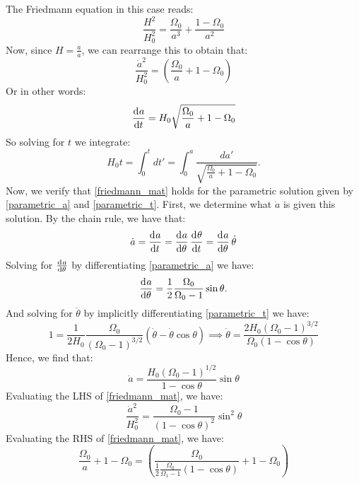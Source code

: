 The Friedmann equation in this case reads:
\begin{equation}
    \boxed{\frac{H^2}{H_0^2} = \frac{\Omega_0}{a^3} + \frac{1 - \Omega_0}{a^2}}
\end{equation}
Now, since $H = \frac{\dot{a}}{a}$, we can rearrange this to obtain that:
\begin{equation}\label{friedmann_mat}
    \frac{\dot{a}^2}{H_0^2} = (\frac{\Omega_0}{a} + 1 - \Omega_0)
\end{equation}
Or in other words:
\begin{equation}
    \dod{a}{t} = H_0\sqrt{\frac{\Omega_0}{a} + 1 - \Omega_0}
\end{equation}
So solving for $t$ we integrate:
\begin{equation}
    \boxed{H_0t = \int_0^t dt' = \int_0^a \frac{da'}{\sqrt{\frac{\Omega_0}{a} + 1 - \Omega_0}}}.
\end{equation}
Now, we verify that \eqref{friedmann_mat} holds for the parametric solution given by \eqref{parametric_a} and \eqref{parametric_t}. First, we determine what $\dot{a}$ is given this solution. By the chain rule, we have that:
\begin{equation}
    \dot{a} = \dod{a}{t} = \dod{a}{\theta}\dod{\theta}{t} = \dod{a}{\theta}\dot{\theta}
\end{equation}
Solving for $\od{a}{\theta}$ by differentiating \eqref{parametric_a} we have:
\begin{equation}
    \dod{a}{\theta} = \frac{1}{2}\frac{\Omega_0}{\Omega_0 - 1}\sin\theta.
\end{equation}
And solving for $\dot{\theta}$ by implicitly differentiating \eqref{parametric_t} we have:
\begin{equation}
    1 = \frac{1}{2H_0}\frac{\Omega_0}{(\Omega_0 - 1)^{3/2}}(\dot{\theta} - \dot{\theta}\cos\theta) \implies \dot{\theta} = \frac{2H_0(\Omega_0 - 1)^{3/2}}{\Omega_0(1-\cos\theta)}
\end{equation}
Hence, we find that:
\begin{equation}
    \dot{a} = \frac{H_0(\Omega_0 - 1)^{1/2}}{1 - \cos\theta}\sin\theta
\end{equation}
Evaluating the LHS of \eqref{friedmann_mat}, we have:
\begin{equation}\label{LHS_friedmann_mat}
    \frac{\dot{a}^2}{H_0^2} = \frac{\Omega_0 - 1}{(1 - \cos\theta)^2}\sin^2\theta
\end{equation}
Evaluating the RHS of \eqref{friedmann_mat}, we have:
\begin{equation}
    \frac{\Omega_0}{a} + 1 - \Omega_0 = (\frac{\Omega_0}{\frac{1}{2}\frac{\Omega_0}{\Omega_1 - 1}(1-\cos\theta)} + 1 - \Omega_0)
\end{equation}

